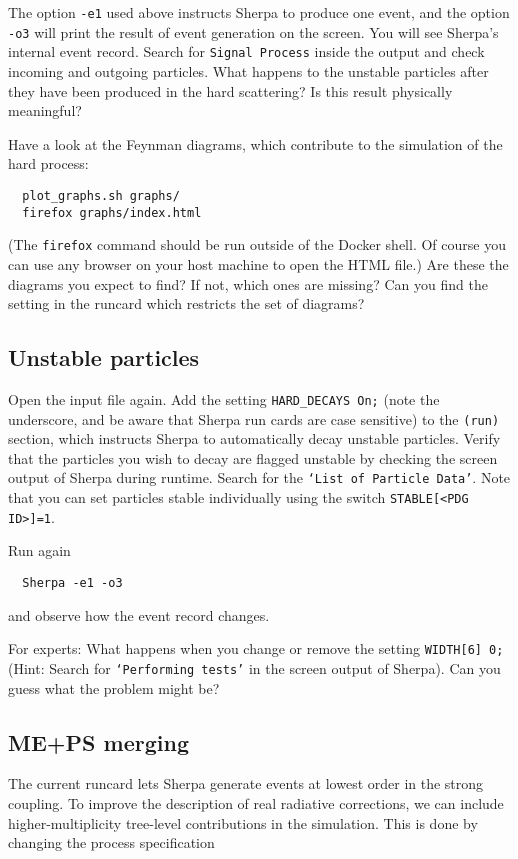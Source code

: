 \documentclass[10pt]{article}
\begin{document}
The option {\tt -e1} used above instructs Sherpa to produce one event, and the option
{\tt -o3} will print the result of event generation on the screen. You will see Sherpa's
internal event record. Search for {\tt Signal Process} inside the output and check
incoming and outgoing particles.
What happens to the unstable particles after they have been produced in the hard
scattering? Is this result physically meaningful?

Have a look at the Feynman diagrams, which contribute to the simulation of the hard process:
\begin{verbatim}
  plot_graphs.sh graphs/
  firefox graphs/index.html
\end{verbatim}
(The \texttt{firefox} command should be run outside of the
Docker shell.
Of course you can use any browser on your host machine
to open the HTML file.)
Are these the diagrams you expect to find? If not, which ones are missing?
Can you find the setting in the runcard which restricts the set of diagrams?

\subsection{Unstable particles}

Open the input file again. Add the setting {\tt HARD\_DECAYS On;}
(note the underscore, and be aware that Sherpa run cards are case sensitive) to
the {\tt(run)} section, which instructs Sherpa to automatically
decay unstable particles. Verify that the particles you wish to decay are
flagged unstable by checking the screen output of Sherpa during runtime.
Search for the {\tt `List of Particle Data'}. Note that you can set particles
stable individually using the switch {\tt STABLE[<PDG ID>]=1}.

Run again
\begin{verbatim}
  Sherpa -e1 -o3
\end{verbatim}
and observe how the event record changes.

For experts: What happens when you change or remove the setting {\tt WIDTH[6] 0;}
(Hint: Search for {\tt `Performing tests'} in the screen output of Sherpa).
Can you guess what the problem might be?

\subsection{ME+PS merging}

The current runcard lets Sherpa generate events at lowest order in the strong coupling.
To improve the description of real radiative corrections, we can include higher-multiplicity
tree-level contributions in the simulation. This is done by changing the process specification
\end{document}
